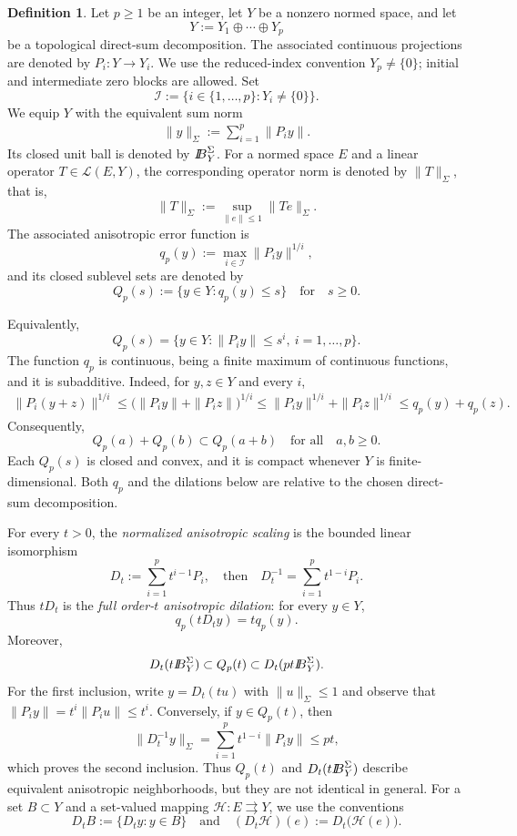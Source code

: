 \documentclass[11pt]{amsart}
\theoremstyle{definition}
\newtheorem{definition}[theorem]{Definition}
\theoremstyle{remark}
\newcommand{\tto}{\rightrightarrows}
\newcommand{\Lin}{\mathcal L}
\def\ball{{I\kern -.35em B}}
\begin{document}
	\begin{definition}
		\label{def:anisotropic-structure}
		Let $p\ge1$ be an integer, let $Y$ be a nonzero normed space, and let
		$$
		Y:=Y_1\oplus\cdots\oplus Y_p
		$$
		be a topological direct-sum decomposition.  The associated continuous
		projections are denoted by $P_i:Y\longrightarrow Y_i$.  We use the
		reduced-index convention $Y_p\ne\{0\}$; initial and intermediate zero
		blocks are allowed.  Set
		$$
		\mathcal I:=\{i\in\{1,\ldots,p\}:Y_i\ne\{0\}\}.
		$$
		We equip $Y$ with
		the equivalent sum norm
		\begin{align*}
			\|y\|_{\Sigma}:=\sum_{i=1}^p\|P_i y\|.
		\end{align*}
		Its closed unit ball is denoted by $\ball_Y^{\Sigma}$.  For a normed space
		$E$ and a linear operator $T\in\Lin(E,Y)$, the corresponding operator norm is denoted by
		$\|T\|_{\Sigma}$, that is,
		$$
		\|T\|_{\Sigma}:=\sup_{\|e\|\le1}\|Te\|_{\Sigma}.
		$$
		The associated anisotropic error function is
		$$
		q_p(y):=\max_{i\in\mathcal I}\|P_i y\|^{1/i},
		$$
		and its closed sublevel sets are denoted by
		$$
		Q_p(s):=\{y\in Y:q_p(y)\le s\}
		\quad\text{for}\quad s\ge0.
		$$
		
		Equivalently,
		$$
		Q_p(s)=\{y\in Y:\|P_i y\|\le s^i,\ i=1,\ldots,p\}.
		$$
		The function $q_p$ is continuous, being a finite maximum of continuous
		functions, and it is subadditive. Indeed, for $y,z\in Y$ and every $i$,
		$$
		\begin{aligned}
			\|P_i(y+z)\|^{1/i}
			\le\bigl(\|P_i y\|+\|P_i z\|\bigr)^{1/i}
			\le\|P_i y\|^{1/i}+\|P_i z\|^{1/i}
			\le q_p(y)+q_p(z).
		\end{aligned}
		$$
		Consequently,
		$$
		Q_p(a)+Q_p(b)\subset Q_p(a+b)
		\quad\text{for all}\quad a,b\ge0.
		$$
		Each $Q_p(s)$ is closed and convex, and it is compact whenever $Y$ is
		finite-dimensional.    Both $q_p$ and the dilations below are
		relative to the chosen direct-sum decomposition.
		
		For every $t>0$, the \emph{normalized anisotropic scaling} is the bounded linear
		isomorphism
		$$
		D_t:=\sum_{i=1}^p t^{i-1}P_i,
		\quad\text{then}\quad
		D_t^{-1}=\sum_{i=1}^p t^{1-i}P_i.
		$$
		Thus $tD_t$ is the \emph{full order-$t$ anisotropic dilation}: for every $y\in Y$,
		$$
		q_p(tD_t y)=tq_p(y).
		$$
		Moreover,
		$$
		D_t(t\ball_Y^\Sigma)
		\subset Q_p(t)
		\subset D_t(pt\ball_Y^\Sigma).
		$$
		For the first inclusion, write $y=D_t(tu)$ with
		$\|u\|_\Sigma\le1$ and observe that
		$\|P_i y\|=t^i\|P_i u\|\le t^i$. Conversely, if $y\in Q_p(t)$, then
		$$
		\|D_t^{-1}y\|_\Sigma
		=\sum_{i=1}^pt^{1-i}\|P_i y\|
		\le pt,
		$$
		which proves the second inclusion.
		Thus $Q_p(t)$ and $D_t(t\ball_Y^\Sigma)$ describe equivalent anisotropic
		neighborhoods, but they are not identical in general.  For a set $B\subset Y$
		and a set-valued mapping $\mathcal H:E\tto Y$, we use the conventions
		$$
		D_tB:=\{D_t y:y\in B\}
		\quad\text{and}\quad
		(D_t\mathcal H)(e):=D_t\bigl(\mathcal H(e)\bigr).
		$$
	\end{definition}
\end{document}
